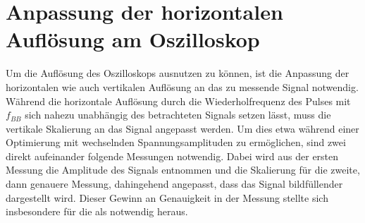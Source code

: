 \documentclass[../Report.tex]{subfiles}
\begin{document}
\section{Anpassung der horizontalen Auflösung am Oszilloskop}

Um die Auflösung des Oszilloskops ausnutzen zu können, ist die Anpassung der horizontalen wie auch vertikalen Auflösung an das zu messende Signal notwendig.
Während die horizontale Auflösung durch die Wiederholfrequenz des Pulses mit $f_{BB}$ sich nahezu unabhängig des betrachteten Signals setzen lässt, muss die vertikale Skalierung an das Signal angepasst werden. Um dies etwa während einer Optimierung mit wechselnden Spannungsamplituden zu ermöglichen, sind zwei direkt aufeinander folgende Messungen notwendig. Dabei wird aus der ersten Messung die Amplitude des Signals entnommen und die Skalierung für die zweite, dann genauere Messung, dahingehend angepasst, dass das Signal bildfüllender dargestellt wird.
Dieser Gewinn an Genauigkeit in der Messung stellte sich insbesondere für die  als notwendig heraus.
\end{document}
